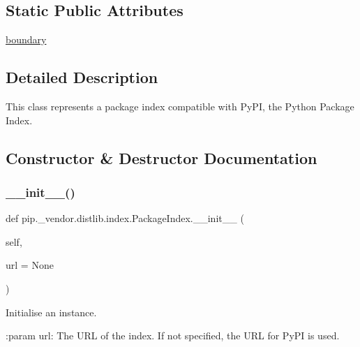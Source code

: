\subsection*{Static Public Attributes}
\begin{DoxyCompactItemize}
\item 
\hyperlink{classpip_1_1__vendor_1_1distlib_1_1index_1_1PackageIndex_ace761c729552ea7fd763793ffb2b6f04}{boundary}
\end{DoxyCompactItemize}


\subsection{Detailed Description}
\begin{DoxyVerb}This class represents a package index compatible with PyPI, the Python
Package Index.
\end{DoxyVerb}
 

\subsection{Constructor \& Destructor Documentation}
\mbox{\label{classpip_1_1__vendor_1_1distlib_1_1index_1_1PackageIndex_a46cfcfcec144286103d44bfcc090961b}} 
\subsubsection{\texorpdfstring{\+\_\+\+\_\+init\+\_\+\+\_\+()}{\_\_init\_\_()}}
{\footnotesize\ttfamily def pip.\+\_\+vendor.\+distlib.\+index.\+Package\+Index.\+\_\+\+\_\+init\+\_\+\+\_\+ (\begin{DoxyParamCaption}\item[{}]{self,  }\item[{}]{url = {\ttfamily None} }\end{DoxyParamCaption})}

\begin{DoxyVerb}Initialise an instance.

:param url: The URL of the index. If not specified, the URL for PyPI is
    used.
\end{DoxyVerb}
 

